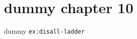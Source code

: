 \clearpage\begingroup\small
\setcounter{chapter}{10}\addtocounter{chapter}{-1}
\chapter{dummy chapter 10}
\begin{example}\label{ex:disall-ladder}dummy \texttt{ex:disall-ladder}\end{example}
\endgroup
